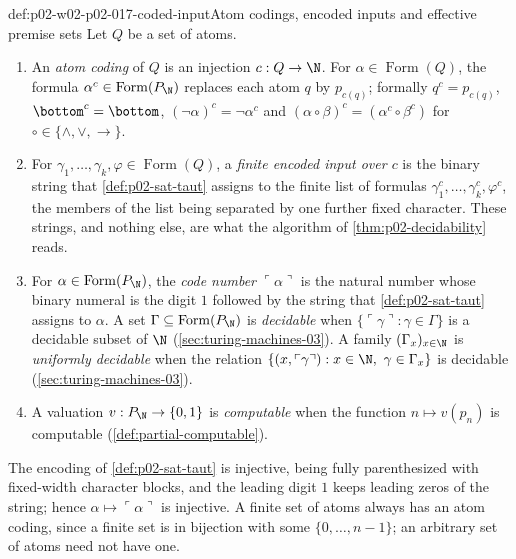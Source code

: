 \begin{hbdefinition}{def:p02-w02-p02-017-coded-input}{Atom codings, encoded inputs and effective premise sets}
Let \(Q\) be a set of atoms.
\begin{enumerate}
 \item An \emph{atom coding} of \(Q\) is an injection \(c:Q\to\N\).
       For \(\alpha\in\operatorname{Form}(Q)\), the formula
       \(\alpha^{c}\in\operatorname{Form}(P_{\N})\) replaces each atom \(q\) by
       \(p_{c(q)}\); formally \(q^{c}=p_{c(q)}\), \(\bottom^{c}=\bottom\),
       \((\neg\alpha)^{c}=\neg\alpha^{c}\) and
       \((\alpha\circ\beta)^{c}=(\alpha^{c}\circ\beta^{c})\) for
       \(\circ\in\{\land,\lor,\to\}\).
 \item For \(\gamma_1,\ldots,\gamma_k,\varphi\in\operatorname{Form}(Q)\),
       a \emph{finite encoded input over \(c\)} is the binary string
       that \cref{def:p02-sat-taut} assigns to the finite list of
       formulas \(\gamma_1^{c},\ldots,\gamma_k^{c},\varphi^{c}\), the
       members of the list being separated by one further fixed
       character.  These strings, and nothing else, are what the
       algorithm of \cref{thm:p02-decidability} reads.
 \item For \(\alpha\in\operatorname{Form}(P_{\N})\), the \emph{code number}
       \(\ulcorner\alpha\urcorner\) is the natural number whose binary
       numeral is the digit \(1\) followed by the string that
       \cref{def:p02-sat-taut} assigns to \(\alpha\).  A set
       \(\Gamma\subseteq\operatorname{Form}(P_{\N})\) is \emph{decidable} when
       \(\{\ulcorner\gamma\urcorner:\gamma\in\Gamma\}\) is a decidable
       subset of \(\N\) (\cref{sec:turing-machines-03}).  A family
       \((\Gamma_x)_{x\in\N}\) is \emph{uniformly decidable} when the
       relation
       \(\{(x,\ulcorner\gamma\urcorner):x\in\N,\ \gamma\in\Gamma_x\}\)
       is decidable (\cref{sec:turing-machines-03}).
 \item A valuation \(v:P_{\N}\to\{0,1\}\) is \emph{computable} when
       the function \(n\mapsto v(p_n)\) is computable
       (\cref{def:partial-computable}).
\end{enumerate}
The encoding of \cref{def:p02-sat-taut} is injective, being fully
parenthesized with fixed-width character blocks, and the leading digit
\(1\) keeps leading zeros of the string; hence
\(\alpha\mapsto\ulcorner\alpha\urcorner\) is injective.  A finite set of atoms always has an atom coding, since a
finite set is in bijection with some \(\{0,\ldots,n-1\}\); an
arbitrary set of atoms need not have one.
\end{hbdefinition}

